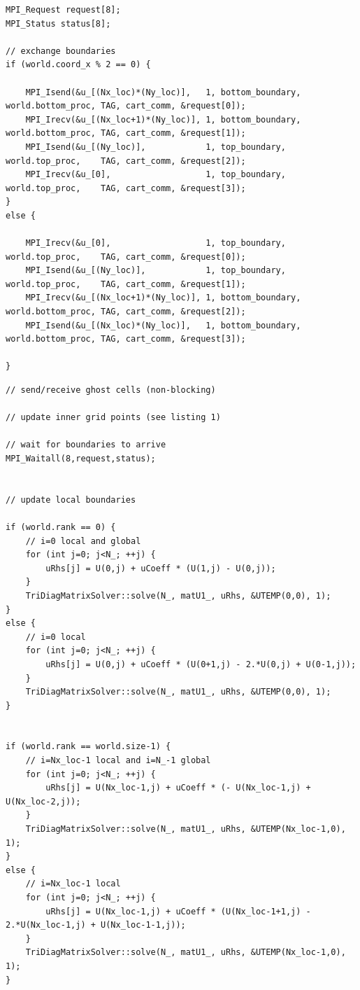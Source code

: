 \documentclass[a4paper]{article}
\begin{document}

\begin{lstlisting}[label={lst:mpi-communication}, caption={Communication of the ghost cells}, float]
MPI_Request request[8];
MPI_Status status[8];

// exchange boundaries
if (world.coord_x % 2 == 0) {
    
    MPI_Isend(&u_[(Nx_loc)*(Ny_loc)],   1, bottom_boundary, world.bottom_proc, TAG, cart_comm, &request[0]);
    MPI_Irecv(&u_[(Nx_loc+1)*(Ny_loc)], 1, bottom_boundary, world.bottom_proc, TAG, cart_comm, &request[1]);
    MPI_Isend(&u_[(Ny_loc)],            1, top_boundary,    world.top_proc,    TAG, cart_comm, &request[2]);
    MPI_Irecv(&u_[0],                   1, top_boundary,    world.top_proc,    TAG, cart_comm, &request[3]);
}
else {
    
    MPI_Irecv(&u_[0],                   1, top_boundary,    world.top_proc,    TAG, cart_comm, &request[0]);
    MPI_Isend(&u_[(Ny_loc)],            1, top_boundary,    world.top_proc,    TAG, cart_comm, &request[1]);
    MPI_Irecv(&u_[(Nx_loc+1)*(Ny_loc)], 1, bottom_boundary, world.bottom_proc, TAG, cart_comm, &request[2]);
    MPI_Isend(&u_[(Nx_loc)*(Ny_loc)],   1, bottom_boundary, world.bottom_proc, TAG, cart_comm, &request[3]);

}
\end{lstlisting}

\begin{lstlisting}[label={lst:adi-mpi}, caption={First half-step parallelized with MPI}, float]
// send/receive ghost cells (non-blocking)

// update inner grid points (see listing 1)

// wait for boundaries to arrive
MPI_Waitall(8,request,status);


// update local boundaries

if (world.rank == 0) {
    // i=0 local and global
    for (int j=0; j<N_; ++j) {
        uRhs[j] = U(0,j) + uCoeff * (U(1,j) - U(0,j));
    }
    TriDiagMatrixSolver::solve(N_, matU1_, uRhs, &UTEMP(0,0), 1);
}
else {
    // i=0 local
    for (int j=0; j<N_; ++j) {
        uRhs[j] = U(0,j) + uCoeff * (U(0+1,j) - 2.*U(0,j) + U(0-1,j));
    }
    TriDiagMatrixSolver::solve(N_, matU1_, uRhs, &UTEMP(0,0), 1);
}


if (world.rank == world.size-1) {
    // i=Nx_loc-1 local and i=N_-1 global
    for (int j=0; j<N_; ++j) {
        uRhs[j] = U(Nx_loc-1,j) + uCoeff * (- U(Nx_loc-1,j) + U(Nx_loc-2,j));
    }
    TriDiagMatrixSolver::solve(N_, matU1_, uRhs, &UTEMP(Nx_loc-1,0), 1);
}
else {
    // i=Nx_loc-1 local
    for (int j=0; j<N_; ++j) {
        uRhs[j] = U(Nx_loc-1,j) + uCoeff * (U(Nx_loc-1+1,j) - 2.*U(Nx_loc-1,j) + U(Nx_loc-1-1,j));
    }
    TriDiagMatrixSolver::solve(N_, matU1_, uRhs, &UTEMP(Nx_loc-1,0), 1);
}
\end{lstlisting}
\end{document}
